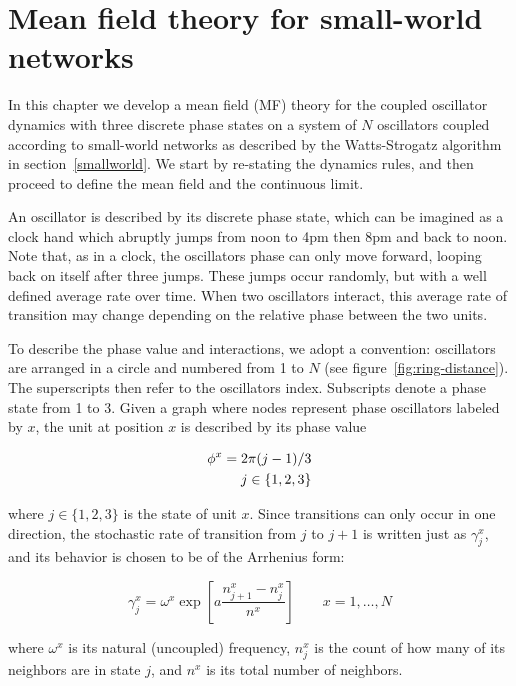 \chapter{Mean field theory for small-world networks}


In this chapter we develop a mean field (MF) theory for the coupled oscillator dynamics with three discrete phase states on a system of
$N$ oscillators coupled according to small-world networks as described by the Watts-Strogatz algorithm in section~\ref{smallworld}. We
start by re-stating the dynamics rules, and then proceed to define the mean field and the continuous limit.

An oscillator is described by its discrete phase state, which can be imagined as a clock hand which abruptly jumps from noon to 4pm
then 8pm and back to noon. Note that, as in a clock, the oscillators phase can only move forward, looping back on itself after three
jumps. These jumps occur randomly, but with a well defined average rate over time. When two oscillators interact, this average rate of
transition may change depending on the relative phase between the two units.

To describe the phase value and interactions, we adopt a convention: oscillators are arranged in a circle and numbered from 1 to $N$
(see figure~\ref{fig:ring-distance}).  The superscripts then refer to the oscillators index. Subscripts denote a phase state from 1 to
3. Given a graph where nodes represent phase oscillators labeled by $x$, the unit at position $x$ is described by its phase value

\begin{align}
    \phi^x = 2\pi (j-1)/3 \\
    j \in \{1,2,3\} \notag
\end{align}

\noindent where $j\in\{1,2,3\}$ is the state of unit $x$. Since transitions can only occur in one direction, the stochastic rate of
transition from $j$ to $j+1$ is written just as $\gamma^x_j$, and its behavior is chosen to be of the Arrhenius form:

\begin{equation}
    \gamma^x_j = \omega^x\exp\left[ a\frac{n^x_{j+1} - n^x_j}{n^x} \right] \qquad x=1,\dots, N
    \label{rate}
\end{equation}

\noindent where $\omega^x$ is its natural (uncoupled) frequency, $n^x_j$ is the count of how many of its neighbors are in state $j$,
and $n^x$ is its total number of neighbors.

